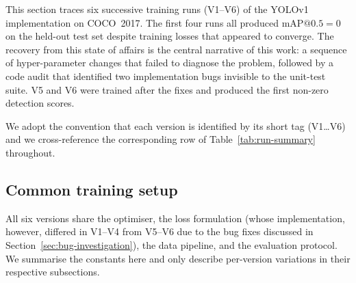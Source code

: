 
This section traces six successive training runs (V1--V6) of the YOLOv1
implementation on COCO~2017. The first four runs all produced
$\mathrm{mAP}@0.5 = 0$ on the held-out test set despite training losses that
appeared to converge. The recovery from this state of affairs is the central
narrative of this work: a sequence of hyper-parameter changes that failed to
diagnose the problem, followed by a code audit that identified two
implementation bugs invisible to the unit-test suite. V5 and V6 were trained
after the fixes and produced the first non-zero detection scores.

We adopt the convention that each version is identified by its short tag
(V1\ldots V6) and we cross-reference the corresponding row of
Table~\ref{tab:run-summary} throughout.

\subsection{Common training setup}
\label{sec:experiments:setup}

All six versions share the optimiser, the loss formulation (whose
implementation, however, differed in V1--V4 from V5--V6 due to the bug fixes
discussed in Section~\ref{sec:bug-investigation}), the data pipeline, and the
evaluation protocol. We summarise the constants here and only describe
per-version variations in their respective subsections.

